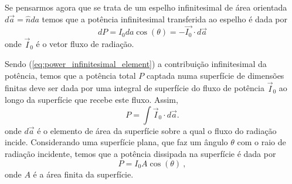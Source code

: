 \documentclass[12pt,a4paper]{article}
\begin{document}
Se pensarmos agora que se trata de um espelho infinitesimal de área orientada
$d\vec a = \hat{n}da$ temos que a potência infinitesimal transferida ao espelho 
é dada por
\begin{equation}
	dP = I_{0} da \cos(\theta) = - \vec{I_0} \cdot d\vec a \label{eq:power_infinitesimal_element}
\end{equation}
onde $\vec I_0$ é o vetor fluxo de radiação.

Sendo (\ref{eq:power_infinitesimal_element}) a contribuição infinitesimal da
potência, temos que a potência total $P$ captada numa superfície de dimensões
finitas deve ser dada por uma integral de superfície do fluxo de potência $\vec I_0$
ao longo da superfície que recebe este fluxo. Assim,
\begin{equation}
	P = \int \vec I_0 \cdot d\vec a . \label{eq:surface_integral}
\end{equation}
onde $ d\vec a$ é o elemento de área da superfície sobre a qual o fluxo do
radiação incide. Considerando uma superfície plana, que faz um ângulo $\theta$ 
com o raio de radiação incidente, temos que a potência dissipada na superfície é dada por
\begin{equation}
	P = I_{0}A\cos(\theta)\ , 
\end{equation}
onde $A$ é a área finita da superfície.
\end{document}
